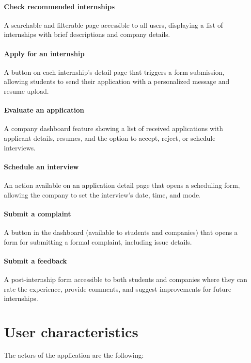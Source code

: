 \paragraph{Check recommended internships}A searchable and filterable page accessible to all users, displaying a list of internships with brief descriptions and company details.
\paragraph{Apply for an internship}A button on each internship's detail page that triggers a form submission, allowing students to send their application with a personalized message and resume upload.
\paragraph{Evaluate an application}A company dashboard feature showing a list of received applications with applicant details, resumes, and the option to accept, reject, or schedule interviews.
\paragraph{Schedule an interview}An action available on an application detail page that opens a scheduling form, allowing the company to set the interview's date, time, and mode.
\paragraph{Submit a complaint}A button in the dashboard (available to students and companies) that opens a form for submitting a formal complaint, including issue details.
\paragraph{Submit a feedback}A post-internship form accessible to both students and companies where they can rate the experience, provide comments, and suggest improvements for future internships.

\section{User characteristics}
\label{sec:user_characteristics}%

The actors of the application are the following:

